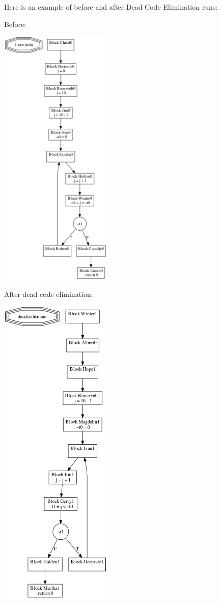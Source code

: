 \documentclass[11pt]{article}
\begin{document}
  Here is an example of before and after Dead Code Elimination runs:

  Before: 

  \includegraphics[width=0.4\textwidth]{./before_deadcode_example.png}
  
  After dead code elimination:

  \includegraphics[width=0.4\textwidth]{./after_deadcode_example.png}
\end{document}

